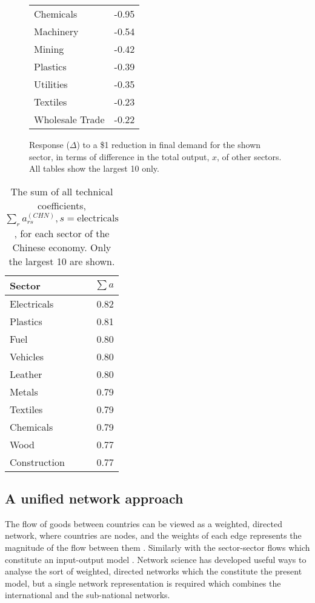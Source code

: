\documentclass[a4paper]{article}
\begin{document}
\begin{figure}
{\begin{tabular}{lr}
		Chemicals         & -0.95 \\
		Machinery         & -0.54 \\
		Mining            & -0.42 \\
		Plastics          & -0.39 \\
		Utilities         & -0.35 \\
		Textiles          & -0.23 \\
		Wholesale Trade   & -0.22 \\
		\bottomrule	
		\end{tabular}
		\label{tbl:chinese_response_to_chn_vec}
	}
	\caption{Response ($\Delta$) to a \$1 reduction in final demand for the shown sector, in terms of difference in the total output, $x$, of other sectors. All tables show the largest 10 only.}
\end{figure}

\begin{table}
\begin{center}
\begin{tabular}{lr}
\toprule
Sector &     $\sum{a}$ \\
\midrule
Electricals  &  0.82 \\
Plastics     &  0.81 \\
Fuel         &  0.80 \\
Vehicles     &  0.80 \\
Leather      &  0.80 \\
Metals       &  0.79 \\
Textiles     &  0.79 \\
Chemicals    &  0.79 \\
Wood         &  0.77 \\
Construction &  0.77 \\
\bottomrule
\end{tabular}
\end{center}
\caption{The sum of all technical coefficients, $\sum_r{a_{rs}^{(CHN)}}, s=\text{electricals}$, for each sector of the Chinese economy. Only the largest 10 are shown.}\label{tbl:chn_electricals}
\end{table}

\subsection*{A unified network approach}
The flow of goods between countries can be viewed as a weighted, directed network, where countries are nodes, and the weights of each edge represents the magnitude of the flow between them \parencite{Nystuen1961,Serrano2003,Bhattacharya2008,Baskaran2011}.
Similarly with the sector-sector flows which constitute an input-output model \parencite{Blochl2011}.
Network science has developed useful ways to analyse the sort of weighted, directed networks which the constitute the present model, but a single network representation is required which combines the international and the sub-national networks.
\end{document}
